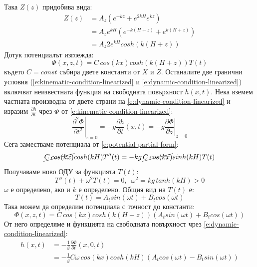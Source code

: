 \documentclass[12pt]{article}
\numberwithin{equation}{section}
\begin{document}
Така $Z(z)$ придобива вида:
\begin{equation}
    \begin{aligned}
        Z(z) &= A_z\left( e^{-kz} + e^{2kH} e^{kz} \right) \\
        &= A_z e^{kH} \left( e^{-k(H+z)} + e^{k(H+z)} \right) \\
        &= A_z 2e^{kH} cosh(k(H+z))
    \end{aligned}
\end{equation}
Дотук потенциалът изглежда:
\begin{equation}
    \label{e:potential-partial-form}
    \Phi(x,z,t) = C \, cos(kx) cosh(k(H+z))T(t)
\end{equation}
където $C=const$ събира двете константи от $X$ и $Z$. Останалите две гранични условия (\autoref{e:kinematic-condition-linearized} и \autoref{e:dynamic-condition-linearized}) включват неизвестната функция на свободната повърхност $h(x,t)$. Нека вземем частната производна от двете страни на \autoref{e:dynamic-condition-linearized} и изразим $\frac{\partial h}{\partial t}$ чрез $\Phi$ от \autoref{e:kinematic-condition-linearized}:
\begin{equation}
    \left. \frac{\partial^2 \Phi}{\partial t^2} \right|_{z=0}
    = -g \frac{\partial h}{\partial t}(x,t)
    = -g \left. \frac{\partial \Phi}{\partial z} \right|_{z=0}
\end{equation}
Сега заместваме потенциала от \autoref{e:potential-partial-form}:
\begin{equation}
    \cancel{C \, cos(kx)} cosh(kH) T''(t) = -kg \, \cancel{C \, cos(kx)} sinh(kH)T(t)
\end{equation}
Получаваме ново ОДУ за функцията $T(t)$:
\begin{equation}
    T''(t) + \omega^2 T(t) = 0,  \enspace \omega^2 = kg \, tanh(kH) > 0
\end{equation}
$\omega$ е определено, ако и $k$ е определено. Общия вид на $T(t)$ е:
\begin{equation}
    T(t) = A_t sin(\omega t) + B_t cos(\omega t)
\end{equation}
Така можем да определим потенциала с точност до константи:
\begin{equation}
    \Phi(x,z,t) = C \, cos(kx) cosh(k(H+z))(A_t sin(\omega t) + B_t cos(\omega t))
\end{equation}
От него определяме и функцията на свободната повърхност чрез \autoref{e:dynamic-condition-linearized}:
\begin{equation}
    \begin{aligned}
        h(x,t) &= -\frac{1}{g}\frac{\partial\Phi}{\partial t}(x,0,t) \\
        &= -\frac{1}{g} C \omega \, cos(kx)cosh(kH)(A_t cos(\omega t) - B_t sin(\omega t))
    \end{aligned}
\end{equation}
\end{document}
